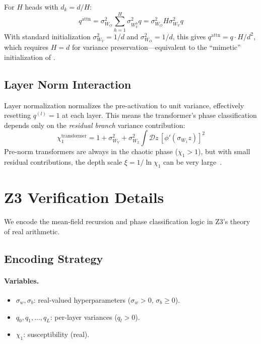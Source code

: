 \documentclass[10pt]{article}
\begin{document}
For $H$ heads with $d_k = d/H$:
\begin{equation}
    q^{\text{attn}} = \sigma_{W_O}^2 \sum_{h=1}^H \sigma_{W_V^h}^2 q = \sigma_{W_O}^2 H \sigma_{W_V}^2 q
\end{equation}
With standard initialization $\sigma_{W_V}^2 = 1/d$ and $\sigma_{W_O}^2 = 1/d$, this gives $q^{\text{attn}} = q \cdot H/d^2$, which requires $H = d$ for variance preservation---equivalent to the ``mimetic'' initialization of \cite{trockman2023mimetic}.

\subsection{Layer Norm Interaction}

Layer normalization normalizes the pre-activation to unit variance, effectively resetting $q^{(l)} = 1$ at each layer.
This means the transformer's phase classification depends only on the \emph{residual branch} variance contribution:
\begin{equation}
    \chi_1^{\text{transformer}} = 1 + \sigma_{W_V}^2 + \sigma_{W_2}^2 \int \mathcal{D}z\, [\phi'(\sigma_{W_1} z)]^2
\end{equation}
Pre-norm transformers are always in the chaotic phase ($\chi_1 > 1$), but with small residual contributions, the depth scale $\xi = 1/\ln \chi_1$ can be very large~\cite{noci2022signal}.
\section{Z3 Verification Details}
\label{app:z3}

We encode the mean-field recursion and phase classification logic in Z3's theory of real arithmetic.

\subsection{Encoding Strategy}

\paragraph{Variables.}
\begin{itemize}[nosep]
    \item $\sigma_w, \sigma_b$: real-valued hyperparameters ($\sigma_w > 0$, $\sigma_b \geq 0$).
    \item $q_0, q_1, \ldots, q_L$: per-layer variances ($q_l > 0$).
    \item $\chi_1$: susceptibility (real).
\end{itemize}
\end{document}

